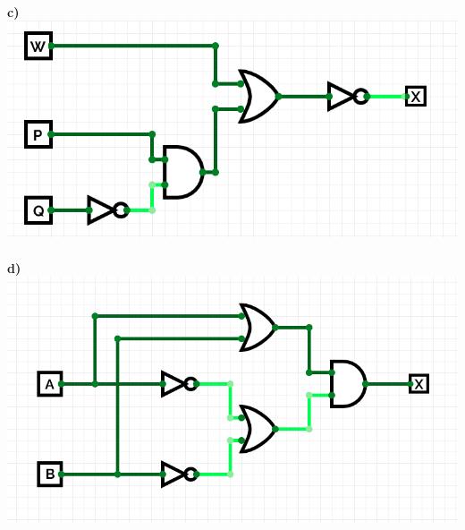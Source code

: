 \documentclass[a4paper]{article}
\begin{document}
\\
\textbf{c)}\\ 
\includegraphics[scale=0.3]{circuit3.png}\\
\\
\textbf{d)}\\ 
\includegraphics[scale=0.3]{circuit4.png}\\
\\
\end{document}
